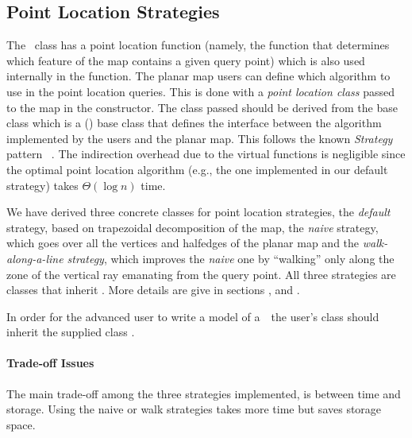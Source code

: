 \begin{ccAdvanced}
\subsection*{Point Location Strategies}
The \ccClassTemplateName\ class has a point location function
(namely, the  function that determines which feature of the map 
contains a given query point)
which is also used internally in the  function.
The planar map users can define which algorithm to use in the
point location queries. This is done with a {\em point location class}
passed to the map in the constructor. The class passed should be derived
from the base class  which is a
() base class that defines the interface between the 
algorithm
implemented by the users and the planar map. This follows the 
known {\it Strategy}
pattern ~\cite{ghjv-dpero-95}. The indirection overhead due to the virtual functions is
negligible since the optimal point location algorithm 
(e.g., the one implemented in our default strategy) takes $\Theta(\log n)$ time.  

We have derived three concrete classes for point location strategies,
the {\it default\/} strategy, based on trapezoidal decomposition of the map,
the {\it naive\/} strategy, which goes over all the vertices and halfedges
of the planar map and the {\it walk-along-a-line strategy\/}, which improves
the {\it naive\/} one by ``walking'' only along the zone of the vertical ray emanating
from the query point. All three strategies are classes
that inherit .
More details are give in sections 
  , 
   and
  .

In order for the advanced user to write a model of a~\ccRefName\ the user's class should inherit the \cgal\/ supplied class 
.

\paragraph{Trade-off Issues}
The main trade-off among the three strategies implemented, is between
time and storage. Using the naive or walk strategies takes more
time but saves storage space.


\end{ccAdvanced}
